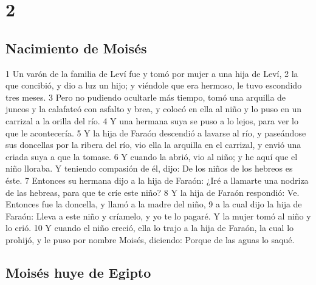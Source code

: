 \chapter{2}

\section{Nacimiento de Moisés}

1 Un varón de la familia de Leví fue y tomó por mujer a una hija de Leví,
2 la que concibió, y dio a luz un hijo; y viéndole que era hermoso, le tuvo escondido tres meses.
3 Pero no pudiendo ocultarle más tiempo, tomó una arquilla de juncos y la calafateó con asfalto y brea, y colocó en ella al niño y lo puso en un carrizal a la orilla del río.
4 Y una hermana suya se puso a lo lejos, para ver lo que le acontecería.
5 Y la hija de Faraón descendió a lavarse al río, y paseándose sus doncellas por la ribera del río, vio ella la arquilla en el carrizal, y envió una criada suya a que la tomase.
6 Y cuando la abrió, vio al niño; y he aquí que el niño lloraba. Y teniendo compasión de él, dijo: De los niños de los hebreos es éste.
7 Entonces su hermana dijo a la hija de Faraón: ¿Iré a llamarte una nodriza de las hebreas, para que te críe este niño?
8 Y la hija de Faraón respondió: Ve. Entonces fue la doncella, y llamó a la madre del niño,
9 a la cual dijo la hija de Faraón: Lleva a este niño y críamelo, y yo te lo pagaré. Y la mujer tomó al niño y lo crió.
10 Y cuando el niño creció, ella lo trajo a la hija de Faraón, la cual lo prohijó, y le puso por nombre Moisés, diciendo: Porque de las aguas lo saqué.

\section{Moisés huye de Egipto}

